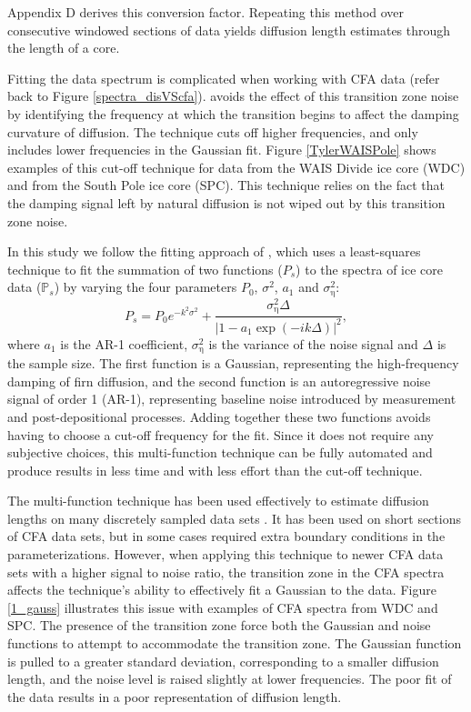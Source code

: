 \documentclass[draft, jgrga]{AGUTeX}
\begin{document}
\begin{article}
Appendix D derives this conversion factor. Repeating this method over consecutive windowed sections of data yields diffusion length estimates through the length of a core.

Fitting the data spectrum is complicated when working with CFA data (refer back to Figure \ref{spectra_disVScfa}). \citet{Jones2017a} avoids the effect of this transition zone noise by identifying the frequency at which the transition begins to affect the damping curvature of diffusion. The technique cuts off higher frequencies, and only includes lower frequencies in the Gaussian fit. Figure \ref{TylerWAISPole} shows examples of this cut-off technique for data from the WAIS Divide ice core (WDC) \citep{Jones2017b} and from the South Pole ice core (SPC). This technique relies on the fact that the damping signal left by natural diffusion is not wiped out by this transition zone noise.

In this study we follow the fitting approach of \citet{Gkinis2014}, which uses a least-squares technique to fit the summation of two functions ($P_s$) to the spectra of ice core data ($\mathbb{P}_s$) by varying the four 
parameters $P_0$, $\sigma^2$, $a_1$ and $\sigma_{\mathrm{\eta}}^2$:
\begin{equation}
P_s =    P_0 {e}^{-k^2 \sigma^2} + \frac{\sigma_{\mathrm{\eta}}^2 \Delta}
{\left| 1-a_1 \exp{\left( -i k  \Delta \right) } \right|^2} {},
\label{eq:powerspectrum}
\end{equation}
where $a_1$ is the AR-1 coefficient, $\sigma_{\mathrm{\eta}}^2$ is the variance of the noise signal 
and $\Delta$ is the sample size. The first function is a Gaussian, representing the high-frequency damping of firn diffusion,
and the second function is an autoregressive noise signal of order 1 (AR-1), representing baseline noise introduced by measurement and post-depositional processes.
Adding together these two functions avoids having to choose a cut-off frequency for the fit. Since it does not require any subjective choices, this multi-function technique can be fully automated and produce results in less time and with less effort than the cut-off technique.

The multi-function technique has been used effectively to estimate diffusion lengths on many discretely sampled data sets \citep{Gkinis2014,Holme2017}. It has been used on short sections of CFA data sets, but in some cases required extra boundary conditions in the parameterizations. However, when applying this technique to newer CFA data sets with a higher signal to noise ratio, the transition zone in the CFA spectra affects the technique's ability to effectively fit a Gaussian to the data. Figure \ref{1_gauss} illustrates this issue with examples of CFA spectra from WDC and SPC. The presence of the transition zone force both the Gaussian and noise functions to attempt to accommodate the transition zone. The Gaussian function is pulled to a greater standard deviation, corresponding to a smaller diffusion length, and the noise level is raised slightly at lower frequencies. The poor fit of the data results in a poor representation of diffusion length.


\end{article}
\end{document}
